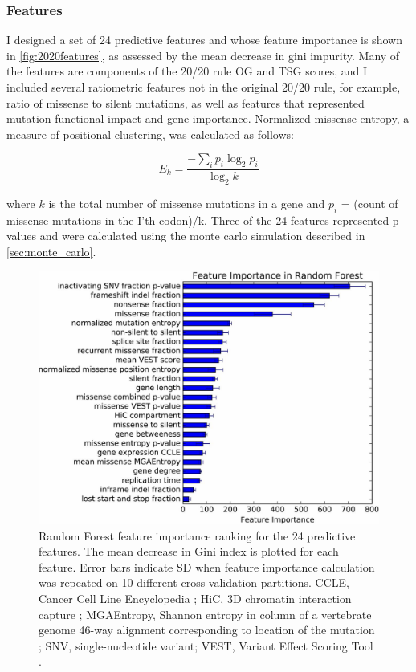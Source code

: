\subsubsection{Features}

I designed a set of 24 predictive features and whose feature importance is shown in \autoref{fig:2020features}, as assessed by the mean decrease in gini impurity. Many of the features are components of the 20/20 rule OG and TSG scores, and I included several ratiometric features not in the original 20/20 rule, for example, ratio of missense to silent mutations, as well as features that represented mutation functional impact and gene importance. Normalized missense entropy, a measure of positional clustering, was calculated as follows:

\begin{equation}
E_k = \frac{-\sum_i{p_i\log_2{p_i}}}{\log_2{k}}
\end{equation}

where $k$ is the total number of missense mutations in a gene and $p_i$ = (count of missense mutations in the I'th codon)/k. Three of the 24 features represented p-values and were calculated using the monte carlo simulation described in \autoref{sec:monte_carlo}.

\begin{figure}
  \centering
  \makeatletter
  \let\@currsize\normalsize
  \includegraphics[width=0.9\linewidth]{figures/chapter3/feature_importance.jpg}
  \caption[Random Forest feature importance ranking for the 24 predictive features.]{Random Forest feature importance ranking for the 24 predictive features. The mean decrease in Gini index is plotted for each feature. Error bars indicate SD when feature importance calculation was repeated on 10 different cross-validation partitions. CCLE, Cancer Cell Line Encyclopedia \cite{RN13}; HiC, 3D chromatin interaction capture \cite{RN13}; MGAEntropy, Shannon entropy in column of a vertebrate genome 46-way alignment corresponding to location of the mutation \cite{RN90}; SNV, single-nucleotide variant; VEST, Variant Effect Scoring Tool \cite{RN30}.}
  \label{fig:2020features}
\end{figure}

